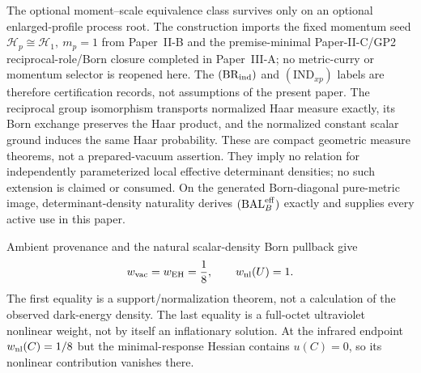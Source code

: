 \documentclass[12pt,a4paper]{article}
\begin{document}
The optional
moment--scale equivalence class survives
only on an optional enlarged-profile process root.  The construction imports the fixed
momentum seed \(\mathcal H_p\cong\mathcal H_1,\ m_p=1\) from Paper~II-B and
the premise-minimal Paper-II-C/GP2 reciprocal-role/Born closure completed in
Paper~III-A; no metric-curry or momentum selector is reopened here.  The
\((\mathrm{BR}_{\rm ind})\) and \((\mathrm{IND}_{xp})\) labels are therefore
certification records, not assumptions of the present paper.
The reciprocal group isomorphism transports normalized Haar measure exactly,
its Born exchange preserves the Haar product, and the normalized constant
scalar ground induces the same Haar probability.  These are compact geometric
measure theorems, not a prepared-vacuum assertion.  They imply no relation
for independently parameterized local effective determinant densities; no
such extension is claimed or consumed.  On the generated Born-diagonal
pure-metric image, determinant-density naturality derives
\((\mathrm{BAL}_B^{\rm eff})\) exactly and supplies every active use in this
paper.

Ambient provenance and the natural scalar-density Born pullback give
\[
 w_{\rm vac}=w_{\rm EH}=\frac18,\qquad w_{\rm nl}(U)=1.
\]
The first equality is a support/normalization theorem, not a calculation of
the observed dark-energy density.  The last equality is a full-octet
ultraviolet nonlinear weight, not by itself an inflationary solution.  At the
infrared endpoint \(w_{\rm nl}(C)=1/8\) but the minimal-response Hessian contains
\(u(C)=0\), so its nonlinear contribution vanishes there.
\end{document}
